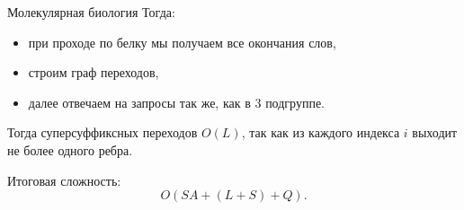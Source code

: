 \begin{tutorial}{Молекулярная биология}
Тогда:
\begin{itemize}
    \item при проходе по белку мы получаем все окончания слов,
    \item строим граф переходов,
    \item далее отвечаем на запросы так же, как в 3 подгруппе.
\end{itemize}
Тогда суперсуффиксных переходов $O(L)$, так как из каждого индекса $i$ выходит не более одного ребра.

Итоговая сложность:
\[
O(SA + (L + S) + Q).
\]



\end{tutorial}
